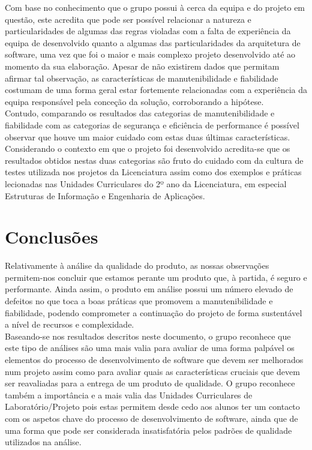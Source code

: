 \documentclass[openany,10pt,a4paper]{article}
\begin{document}
Com base no conhecimento que o grupo possui à cerca da equipa e do projeto em questão, este acredita que pode ser possível relacionar a natureza e particularidades de algumas das regras violadas com a falta de experiência da equipa de desenvolvido quanto a algumas das particularidades da arquitetura de software, uma vez que foi o maior e mais complexo projeto desenvolvido até ao momento da sua elaboração. Apesar de não existirem dados que permitam afirmar tal observação, as características de manutenibilidade e fiabilidade costumam de uma forma geral estar fortemente relacionadas com a experiência da equipa responsável pela conceção da solução, corroborando a hipótese. \\
Contudo, comparando os resultados das categorias de manutenibilidade e fiabilidade com as categorias de segurança e eficiência de performance é possível observar que houve um maior cuidado com estas duas últimas características. Considerando o contexto em que o projeto foi desenvolvido acredita-se que os resultados obtidos nestas duas categorias são fruto do cuidado com da cultura de testes utilizada nos projetos da Licenciatura assim como dos exemplos e práticas lecionadas nas Unidades Curriculares do 2º ano da Licenciatura, em especial Estruturas de Informação e Engenharia de Aplicações.

\section{Conclusões}
Relativamente à análise da qualidade do produto, as nossas observações permitem-nos concluir que estamos perante um produto que, à partida, é seguro e performante. Ainda assim, o produto em análise possui um número elevado de defeitos no que toca a boas práticas que promovem a manutenibilidade e fiabilidade, podendo comprometer a continuação do projeto de forma sustentável a nível de recursos e complexidade. \\
Baseando-se nos resultados descritos neste documento, o grupo reconhece que este tipo de análises são uma mais valia para avaliar de uma forma palpável os elementos do processo de desenvolvimento de software que devem ser melhorados num projeto assim como para avaliar quais as características cruciais que devem ser reavaliadas para a entrega de um produto de qualidade. O grupo reconhece também a importância e a mais valia das Unidades Curriculares de Laboratório/Projeto pois estas permitem desde cedo aos alunos ter um contacto com os aspetos chave do processo de desenvolvimento de software, ainda que de uma forma que pode ser considerada insatisfatória pelos padrões de qualidade utilizados na análise.
\end{document}
